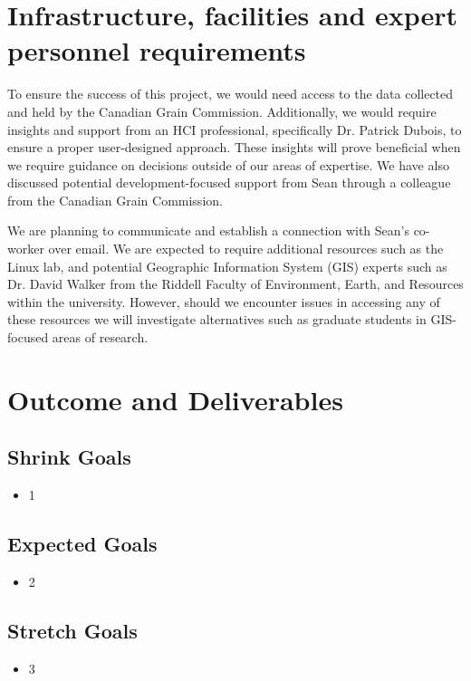 \documentclass[12pt]{article}
\begin{document}
\section*{Infrastructure, facilities and expert personnel requirements}

To ensure the success of this project, we would need access to the data collected and held by the Canadian Grain Commission. Additionally, we would require insights and support from an HCI professional, specifically Dr. Patrick Dubois, to ensure a proper user-designed approach. These insights will prove beneficial when we require guidance on decisions outside of our areas of expertise. We have also discussed potential development-focused support from Sean through a colleague from the Canadian Grain Commission. 

We are planning to communicate and establish a connection with Sean’s co-worker over email. We are expected to require additional resources such as the Linux lab, and potential Geographic Information System (GIS) experts such as Dr. David Walker from the Riddell Faculty of Environment, Earth, and Resources within the university. However, should we encounter issues in accessing any of these resources we will investigate alternatives such as graduate students in GIS-focused areas of research.   

\section*{Outcome and Deliverables}
\subsection*{Shrink Goals}
\begin{itemize}
    \item  1
\end{itemize}

\subsection*{Expected Goals}
\begin{itemize}
    \item  2
\end{itemize}

\subsection*{Stretch Goals}
\begin{itemize}
    \item  3
\end{itemize}
\end{document}
